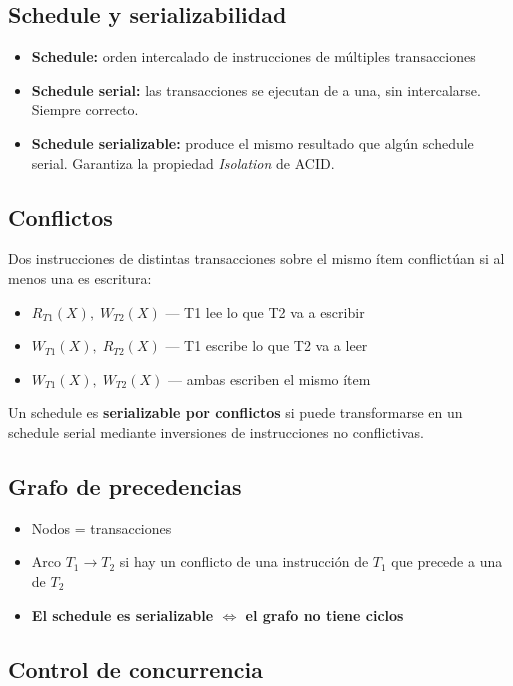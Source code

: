 \documentclass[12pt, a4paper]{article}
\begin{document}
\subsection{Schedule y serializabilidad}
\begin{itemize}
  \item \textbf{Schedule:} orden intercalado de instrucciones de múltiples transacciones
  \item \textbf{Schedule serial:} las transacciones se ejecutan de a una, sin intercalarse. Siempre correcto.
  \item \textbf{Schedule serializable:} produce el mismo resultado que algún schedule serial. Garantiza la propiedad \textit{Isolation} de ACID.
\end{itemize}

\subsection{Conflictos}
Dos instrucciones de distintas transacciones sobre el mismo ítem conflictúan si al menos una es escritura:
\begin{itemize}
  \item $R_{T1}(X),\; W_{T2}(X)$ — T1 lee lo que T2 va a escribir
  \item $W_{T1}(X),\; R_{T2}(X)$ — T1 escribe lo que T2 va a leer
  \item $W_{T1}(X),\; W_{T2}(X)$ — ambas escriben el mismo ítem
\end{itemize}

Un schedule es \textbf{serializable por conflictos} si puede transformarse en un schedule serial mediante inversiones de instrucciones no conflictivas.

\subsection{Grafo de precedencias}
\begin{itemize}
  \item Nodos = transacciones
  \item Arco $T_1 \rightarrow T_2$ si hay un conflicto de una instrucción de $T_1$ que precede a una de $T_2$
  \item \textbf{El schedule es serializable $\Longleftrightarrow$ el grafo no tiene ciclos}
\end{itemize}

\subsection{Control de concurrencia}
\end{document}
